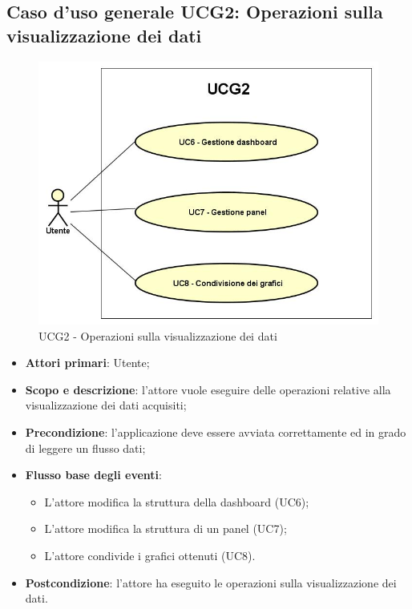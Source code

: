 \subsection{Caso d'uso generale UCG2: Operazioni sulla visualizzazione dei dati}
\begin{figure} [H]
	\centering
	\includegraphics[scale=0.5]{Img/UCG2}
	\caption{UCG2 - Operazioni sulla visualizzazione dei dati}
\end{figure}
\begin{itemize} 
	\item{\textbf{Attori primari}: Utente;}
	\item{\textbf{Scopo e descrizione}: l'attore vuole eseguire delle operazioni relative alla visualizzazione dei dati acquisiti;} 
	\item{\textbf{Precondizione}: l'applicazione deve essere avviata correttamente ed in grado di leggere un flusso dati;} 
	\item{\textbf{Flusso base degli eventi}: 
		\begin{itemize} 
			\item{L'attore modifica la struttura della dashboard (UC6);} 
			\item{L'attore modifica la struttura di un panel (UC7);} 
			\item{L'attore condivide i grafici ottenuti (UC8)}. 
		\end{itemize} 
	} 
	\item{\textbf{Postcondizione}: l'attore ha eseguito le operazioni sulla visualizzazione dei dati.} 
\end{itemize} 
\newpage
